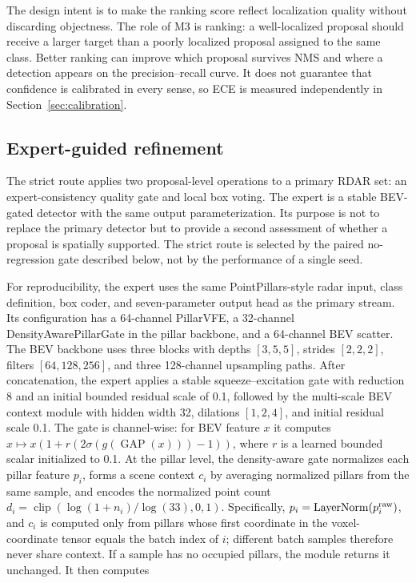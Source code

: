 \documentclass[sensors,article,submit,pdftex,moreauthors]{Definitions/mdpi}
\begin{document}
The design intent is to make the ranking score reflect localization quality
without discarding objectness. The role of M3 is ranking: a well-localized proposal should receive a larger
target than a poorly localized proposal assigned to the same class. Better
ranking can improve which proposal survives NMS and where a detection appears
on the precision--recall curve. It does not guarantee that confidence is
calibrated in every sense, so ECE is measured independently in
Section~\ref{sec:calibration}.

\subsection{Expert-guided refinement}

The strict route applies two proposal-level operations to a primary RDAR set:
an expert-consistency quality gate and local box voting. The expert is a
stable BEV-gated detector with the same output parameterization. Its purpose is
not to replace the primary detector but to provide a second assessment of
whether a proposal is spatially supported. The strict route is selected by the
paired no-regression gate described below, not by the performance of a single
seed.

For reproducibility, the expert uses the same PointPillars-style radar input,
class definition, box coder, and seven-parameter output head as the primary
stream. Its configuration has a 64-channel PillarVFE, a 32-channel
DensityAwarePillarGate in the pillar backbone, and a 64-channel BEV scatter.
The BEV backbone uses three blocks with depths $[3,5,5]$, strides
$[2,2,2]$, filters $[64,128,256]$, and three 128-channel upsampling paths.
After concatenation, the expert applies a stable squeeze--excitation gate with
reduction 8 and an initial bounded residual scale of 0.1, followed by the
multi-scale BEV context module with hidden width 32, dilations $[1,2,4]$, and
initial residual scale 0.1. The gate is channel-wise: for BEV feature $x$ it
computes $x\mapsto x(1+r(2\sigma(g(\operatorname{GAP}(x)))-1))$, where $r$ is
a learned bounded scalar initialized to 0.1. At the pillar level, the density-aware gate
normalizes each pillar feature $p_i$, forms a scene context $c_i$ by averaging
normalized pillars from the same sample, and encodes the normalized point
count $d_i=\operatorname{clip}(\log(1+n_i)/\log(33),0,1)$. Specifically,
$p_i=\operatorname{LayerNorm}(p_i^{\rm raw})$, and $c_i$ is computed only
from pillars whose first coordinate in the voxel-coordinate tensor equals the
batch index of $i$; different batch samples therefore never share context.
If a sample has no occupied pillars, the module returns it unchanged. It then computes
\end{document}
